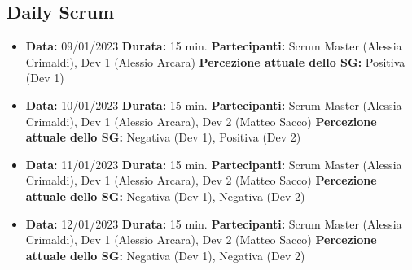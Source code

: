 \documentclass{article}
\begin{document}
    \subsection{Daily Scrum}
    \begin{itemize}
        \item \textbf{Data:} 09/01/2023
        \newline \textbf{Durata:} 15 min.
        \newline \textbf{Partecipanti:} Scrum Master (Alessia Crimaldi), Dev 1 (Alessio Arcara)
        \newline \textbf{Percezione attuale dello SG:} Positiva (Dev 1)
    \end{itemize}
    \begin{itemize}
        \item \textbf{Data:} 10/01/2023
        \newline \textbf{Durata:} 15 min.
        \newline \textbf{Partecipanti:} Scrum Master (Alessia Crimaldi), Dev 1 (Alessio Arcara), Dev 2 (Matteo Sacco)
        \newline \textbf{Percezione attuale dello SG:} Negativa (Dev 1), Positiva (Dev 2)
    \end{itemize}
    \begin{itemize}
        \item \textbf{Data:} 11/01/2023
        \newline \textbf{Durata:} 15 min.
        \newline \textbf{Partecipanti:} Scrum Master (Alessia Crimaldi), Dev 1 (Alessio Arcara), Dev 2 (Matteo Sacco)
        \newline \textbf{Percezione attuale dello SG:} Negativa (Dev 1), Negativa (Dev 2)
    \end{itemize}
    \begin{itemize}
        \item \textbf{Data:} 12/01/2023
        \newline \textbf{Durata:} 15 min.
        \newline \textbf{Partecipanti:} Scrum Master (Alessia Crimaldi), Dev 1 (Alessio Arcara), Dev 2 (Matteo Sacco)
        \newline \textbf{Percezione attuale dello SG:} Negativa (Dev 1), Negativa (Dev 2)
    \end{itemize}
\end{document}
